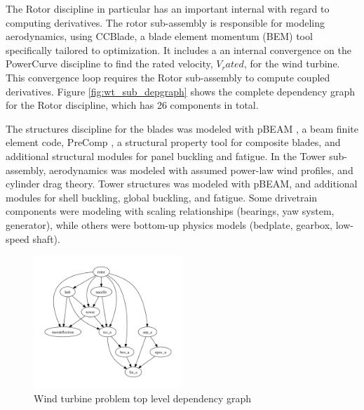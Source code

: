 \documentclass[]{aiaa-tc} %
\begin{document}
    The Rotor discipline in particular has an important internal with regard to computing derivatives. 
    The rotor sub-assembly is responsible for modeling aerodynamics, using CCBlade\cite{NING:BEM}, 
    a blade element momentum (BEM) tool specifically tailored to optimization. It includes a
    an internal convergence on the PowerCurve discipline to find the 
    rated velocity, $V_rated$, for the wind turbine. This convergence loop requires the Rotor 
    sub-assembly to compute coupled derivatives. Figure \ref{fig:wt_sub_depgraph} shows the complete 
    dependency graph for the Rotor discipline, which has 26 components in total. 

    The structures discipline for the blades was modeled with pBEAM \cite{Ning2013b},
    a beam finite element code, PreComp \cite{Bir2005}, a structural property tool for
    composite blades, and additional structural modules for panel buckling and fatigue. In the Tower sub-assembly, 
    aerodynamics was modeled with assumed power-law wind profiles, and cylinder drag theory.
    Tower structures was modeled with pBEAM, and additional modules for shell buckling,
    global buckling, and fatigue.  Some drivetrain components were modeling with scaling
    relationships (bearings, yaw system, generator), while others were bottom-up physics
    models (bedplate, gearbox, low-speed shaft). 


    \begin{figure}[!htbp]
        \centering
        \includegraphics[width=0.5\textwidth]{images/wt_depgraph}
        \caption{Wind turbine problem top level dependency graph}
        \label{fig:wt_top_depgraph}
    \end{figure}
\end{document}
